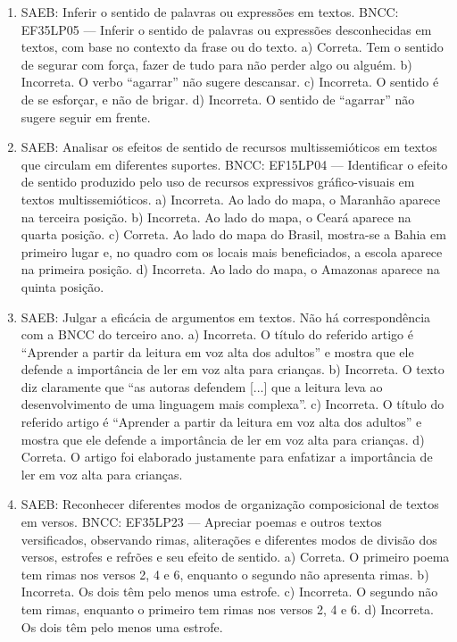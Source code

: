 \begin{enumerate}
\item
SAEB: Inferir o sentido de palavras ou expressões em textos. BNCC: EF35LP05 --- Inferir o sentido de palavras ou expressões desconhecidas em textos, com base no contexto da frase ou do texto. a) Correta. Tem o sentido de segurar com força, fazer de tudo para não perder algo ou alguém. b) Incorreta. O verbo ``agarrar'' não sugere descansar. c) Incorreta. O sentido é de se esforçar, e não de brigar. d) Incorreta. O sentido de ``agarrar'' não sugere seguir em frente.

\item
SAEB: Analisar os efeitos de sentido de recursos multissemióticos em textos que circulam em diferentes suportes. BNCC: EF15LP04 --- Identificar o efeito de sentido produzido pelo uso de recursos expressivos gráfico-visuais em textos multissemióticos. a) Incorreta. Ao lado do mapa, o Maranhão aparece na terceira posição. b) Incorreta. Ao lado do mapa, o Ceará aparece na quarta posição. c) Correta. Ao lado do mapa do Brasil, mostra-se a Bahia em primeiro lugar e, no quadro com os locais mais beneficiados, a escola aparece na primeira posição. d) Incorreta. Ao lado do mapa, o Amazonas aparece na quinta posição.

\item
SAEB: Julgar a eficácia de argumentos em textos. Não há correspondência com a BNCC do terceiro ano. a) Incorreta. O título do referido artigo é ``Aprender a partir da leitura em voz alta dos adultos'' e mostra que ele defende a importância de ler em voz alta para crianças. b) Incorreta. O texto diz claramente que ``as autoras defendem {[}...{]} que a leitura leva ao desenvolvimento de uma linguagem mais complexa''. c) Incorreta. O título do referido artigo é ``Aprender a partir da leitura em voz alta dos adultos'' e mostra que ele defende a importância de ler em voz alta para crianças. d) Correta. O artigo foi elaborado justamente para enfatizar a importância de ler em voz alta para crianças.

\item
SAEB: Reconhecer diferentes modos de organização composicional de textos em versos. BNCC: EF35LP23 --- Apreciar poemas e outros textos versificados, observando rimas, aliterações e diferentes modos de divisão dos versos, estrofes e refrões e seu efeito de sentido. a) Correta. O primeiro poema tem rimas nos versos 2, 4 e 6, enquanto o segundo não apresenta rimas. b) Incorreta. Os dois têm pelo menos uma estrofe. c) Incorreta. O segundo não tem rimas, enquanto o primeiro tem rimas nos versos 2, 4 e 6. d) Incorreta. Os dois têm pelo menos uma estrofe.


\end{enumerate}

